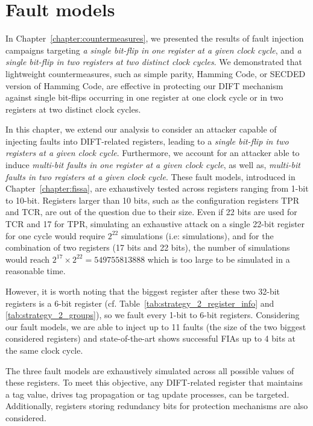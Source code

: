 \section{Fault models}
\label{section:chap6_faultmodels}
In Chapter~\ref{chapter:countermeasures}, we presented the results of fault injection campaigns targeting \textit{a single bit-flip in one register at a given clock cycle}, and \textit{a single bit-flip in two registers at two distinct clock cycles}. We demonstrated that lightweight countermeasures, such as simple parity, Hamming Code, or SECDED version of Hamming Code, are effective in protecting our DIFT mechanism against single bit-flips occurring in one register at one clock cycle or in two registers at two distinct clock cycles.

In this chapter, we extend our analysis to consider an attacker capable of injecting faults into DIFT-related registers, leading to a \textit{single bit-flip in two registers at a given clock cycle}. Furthermore, we account for an attacker able to induce \textit{multi-bit faults in one register at a given clock cycle}, as well as, \textit{multi-bit faults in two registers at a given clock cycle}. These fault models, introduced in Chapter~\ref{chapter:fissa}, are exhaustively tested across registers ranging from 1-bit to 10-bit. Registers larger than 10 bits, such as the configuration registers TPR and TCR, are out of the question due to their size. Even if 22 bits are used for TCR and 17 for TPR, simulating an exhaustive attack on a single 22-bit register for one cycle would require $2^{22}$ simulations (i.e:  simulations), and for the combination of two registers (17 bits and 22 bits), the number of simulations would reach $2^{17} \times 2^{22} = \num{549755813888}$ which is too large to be simulated in a reasonable time.

However, it is worth noting that the biggest register after these two 32-bit registers is a 6-bit register (cf. Table~\ref{tab:strategy_2_register_info} and \ref{tab:strategy_2_groups}), so we fault every 1-bit to 6-bit registers. Considering our fault models, we are able to inject up to 11 faults (the size of the two biggest considered registers) and state-of-the-art shows successful FIAs up to 4 bits at the same clock cycle.

The three fault models are exhaustively simulated across all possible values of these registers. To meet this objective, any DIFT-related register that maintains a tag value, drives tag propagation or tag update processes, can be targeted. Additionally, registers storing redundancy bits for protection mechanisms are also considered.

